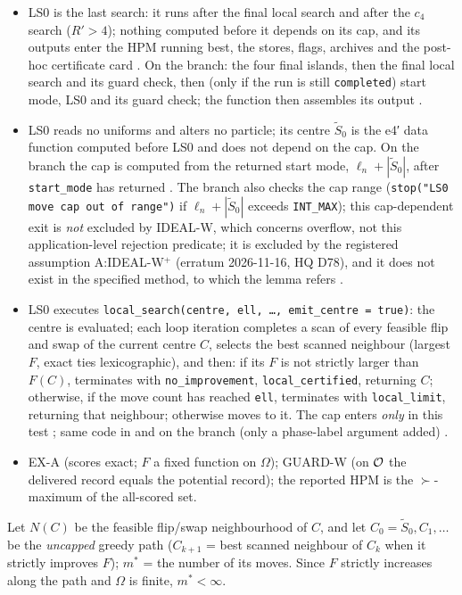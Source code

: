 \begin{itemize}
\item[(L1)] LS0 is the last search: it runs after the final local search and after the $c_4$ search ($R'>4$); nothing computed before it depends on its cap, and its outputs enter the HPM running best, the stores, flags, archives and the post-hoc certificate card . On the branch: the four final islands, then the final local search and its guard check, then (only if the run is still \texttt{completed}) start mode, LS0 and its guard check; the function then assembles its output .
\item[(L2)] LS0 reads no uniforms and alters no particle; its centre $\tilde{S}_0$ is the e4′ data function computed before LS0 and does not depend on the cap. On the branch the cap is computed from the returned start mode, $\ell_n+|\tilde S_0|$, after \texttt{start\_mode} has returned . The branch also checks the cap range (\texttt{stop("LS0 move cap out of range")} if $\ell_n+|\tilde S_0|$ exceeds \texttt{INT\_MAX}); this cap-dependent exit is \emph{not} excluded by IDEAL-W, which concerns overflow, not this application-level rejection predicate; it is excluded by the registered assumption A:IDEAL-W$^{+}$ (erratum 2026-11-16, HQ D78), and it does not exist in the specified method, to which the lemma refers .
\item[(L3)] LS0 executes \texttt{local\_search(centre, ell, \ldots, emit\_centre = true)}: the centre is evaluated; each loop iteration completes a scan of every feasible flip and swap of the current centre $C$, selects the best scanned neighbour (largest $F$, exact ties lexicographic), and then: if its $F$ is not strictly larger than $F(C)$, terminates with \texttt{no\_improvement}, \texttt{local\_certified}, returning $C$; otherwise, if the move count has reached \texttt{ell}, terminates with \texttt{local\_limit}, returning that neighbour; otherwise moves to it. The cap enters \emph{only} in this test ; same code in  and on the branch (only a phase-label argument added) .
\item[(L4)] EX-A (scores exact; $F$ a fixed function on $\Omega$); GUARD-W (on $\mathcal O$ the delivered record equals the potential record); the reported HPM is the $\succ$-maximum of the all-scored set.
\end{itemize}
Let $N(C)$ be the feasible flip/swap neighbourhood of $C$, and let $C_0=\tilde{S}_0,C_1,\dots$ be the \emph{uncapped} greedy path ($C_{k+1}$ = best scanned neighbour of $C_k$ when it strictly improves $F$); $m^*$ = the number of its moves. Since $F$ strictly increases along the path and $\Omega$ is finite, $m^*<\infty$.

